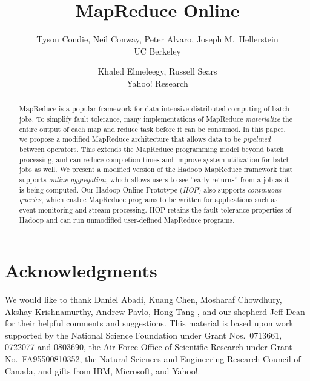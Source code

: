 \documentclass[letterpaper,twocolumn,10pt]{article}
\begin{document}
\date{}

\title{\Large \bf MapReduce Online}

\author{
{\rm Tyson Condie, Neil Conway, Peter Alvaro, Joseph M.\ Hellerstein}\\ UC Berkeley
\and
{\rm Khaled Elmeleegy, Russell Sears}\\ Yahoo! Research
}

\maketitle

\begin{abstract}
  MapReduce is a popular framework for data-intensive distributed computing of
  batch jobs. To simplify fault tolerance, many implementations of MapReduce
  \emph{materialize} the entire output of each map and reduce task before it can
  be consumed. In this paper, we propose a modified MapReduce architecture that
  allows data to be \emph{pipelined} between operators. This extends the
  MapReduce programming model beyond batch processing, and can reduce completion
  times and improve system utilization for batch jobs as well.  We present a
  modified version of the Hadoop MapReduce framework that supports \emph{online
    aggregation}, which allows users to see ``early returns'' from a job as it
  is being computed. Our Hadoop Online Prototype ({\em HOP}) also supports
  \emph{continuous queries}, which enable MapReduce programs to be written for
  applications such as event monitoring and stream processing. HOP retains the
  fault tolerance properties of Hadoop and can run unmodified user-defined
  MapReduce programs.
\end{abstract}










\section*{Acknowledgments}
We would like to thank Daniel Abadi, Kuang Chen, Mosharaf Chowdhury, Akshay
Krishnamurthy, Andrew Pavlo, Hong Tang , and our shepherd Jeff Dean for their
helpful comments and suggestions. This material is based upon work supported by
the National Science Foundation under Grant Nos.\ 0713661, 0722077 and 0803690,
the Air Force Office of Scientific Research under Grant No.\ FA95500810352, the
Natural Sciences and Engineering Research Council of Canada, and gifts from IBM,
Microsoft, and Yahoo!.

{\footnotesize 
}
\end{document}
